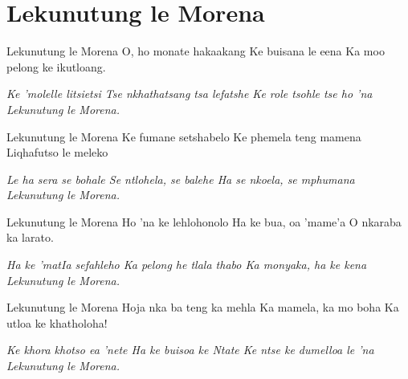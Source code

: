 \starttocol
\chapter{Lekunutung le Morena}
\nexttocol
\hfill{\it }
\stoptocol
\starttocol
\startlines
{\sc Lekunutung} le  Morena 
O, ho monate hakaakang
Ke buisana le eena
Ka moo pelong ke ikutloang.

{\it Ke 'molelle litsietsi 
Tse nkhathatsang tsa lefatshe
Ke role tsohle tse ho 'na 
Lekunutung le Morena.}

Lekunutung le Morena
Ke fumane setshabelo
Ke phemela teng mamena
Liqhafutso le meleko

{\it Le ha sera se bohale
Se ntlohela, se balehe
Ha se nkoela, se mphumana
Lekunutung le Morena.}

Lekunutung le Morena
Ho 'na ke lehlohonolo 
Ha ke bua, oa 'mame'a
O nkaraba ka larato. 

{\it Ha ke 'matIa sefahleho
Ka pelong he tlala thabo
Ka monyaka, ha ke kena
Lekunutung le Morena.}

Lekunutung le Morena
Hoja nka ba teng ka mehla
Ka mamela, ka mo boha
Ka utloa ke khatholoha!

{\it Ke khora khotso ea 'nete
Ha ke buisoa ke Ntate
Ke ntse ke dumelloa le 'na
Lekunutung le Morena.}

\stoplines
\nexttocol

\stoptocol
